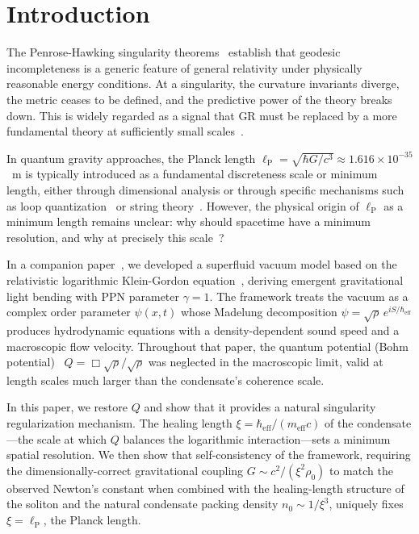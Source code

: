 \documentclass[12pt, a4paper]{article}
\newcommand{\meff}{m_{\mathrm{eff}}}
\newcommand{\heff}{\hbar_{\mathrm{eff}}}
\newcommand{\lP}{\ell_{\mathrm{P}}}
\begin{document}
\section{Introduction}
\label{sec:intro}

The Penrose-Hawking singularity theorems~\cite{penrose_1965,hawking_1970} establish that geodesic incompleteness is a generic feature of general relativity under physically reasonable energy conditions. At a singularity, the curvature invariants diverge, the metric ceases to be defined, and the predictive power of the theory breaks down. This is widely regarded as a signal that GR must be replaced by a more fundamental theory at sufficiently small scales~\cite{dewitt_1967}.

In quantum gravity approaches, the Planck length $\lP = \sqrt{\hbar G/c^3} \approx 1.616 \times 10^{-35}$~m is typically introduced as a fundamental discreteness scale or minimum length, either through dimensional analysis or through specific mechanisms such as loop quantization~\cite{rovelli_2004, ashtekar_2006} or string theory~\cite{polchinski_1998}. However, the physical origin of $\lP$ as a minimum length remains unclear: why should spacetime have a minimum resolution, and why at precisely this scale~\cite{garay_1995}?

In a companion paper~\cite{kulangiev_2026a}, we developed a superfluid vacuum model based on the relativistic logarithmic Klein-Gordon equation~\cite{rosen_1969, bartkowski_gorka_2008}, deriving emergent gravitational light bending with PPN parameter $\gamma = 1$. The framework treats the vacuum as a complex order parameter $\psi(x,t)$ whose Madelung decomposition $\psi = \sqrt{\rho}\,e^{iS/\heff}$ produces hydrodynamic equations with a density-dependent sound speed and a macroscopic flow velocity. Throughout that paper, the quantum potential (Bohm potential)~\cite{bohm_1952} $Q = \Box\sqrt{\rho}/\sqrt{\rho}$ was neglected in the macroscopic limit, valid at length scales much larger than the condensate's coherence scale.

In this paper, we restore $Q$ and show that it provides a natural singularity regularization mechanism. The healing length $\xi = \heff/(\meff c)$ of the condensate---the scale at which $Q$ balances the logarithmic interaction---sets a minimum spatial resolution. We then show that self-consistency of the framework, requiring the dimensionally-correct gravitational coupling $G \sim c^2/(\xi^2 \rho_0)$ to match the observed Newton's constant when combined with the healing-length structure of the soliton and the natural condensate packing density $n_0 \sim 1/\xi^3$, uniquely fixes $\xi = \lP$, the Planck length.
\end{document}
